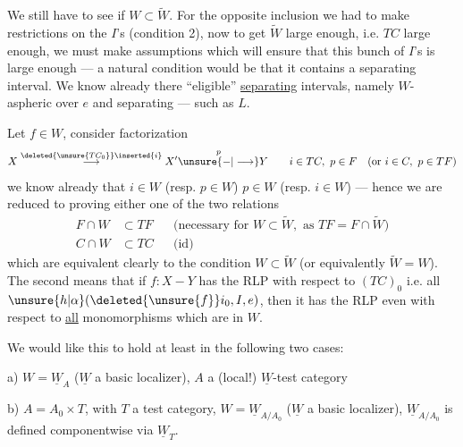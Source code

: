 
We still have to see if $W\subset\widetilde W$. For the opposite inclusion we had to make restrictions  on the $I$'s (condition 2), now to get $\widetilde W$ large enough, i.e. $TC$ large enough, we must make assumptions which will ensure that this bunch of $I$'s is large enough --- a natural condition would be that it contains a separating interval. We know already there   ``eligible'' \uline{separating} intervals, namely $W$-aspheric over $e$ and separating --- such as $L$.

Let $f\in W$, consider factorization
\[
X\overset{\deleted{\unsure{TC_0}}\inserted{i}}{\longrightarrow}X'\overset{p}{\unsure{-|\longrightarrow}}Y\qquad i\in TC,\ p\in F\quad(\text{or }i\in C,\ p\in TF)
\]
we know already that $i\in W$ (resp. $p\in W$)  $p\in W$ (resp. $i\in W$) --- hence we are reduced to  proving either one of the two relations
\[
\begin{aligned}
F\cap W&\subset TF&&\text{(necessary for }W\subset\widetilde W,\text{ as }TF=F\cap\widetilde W)\\
C\cap W&\subset TC&&\text{(id)}
\end{aligned}
\]
which are  equivalent  clearly to the condition $W\subset\widetilde W$ (or equivalently  $\widetilde W=W$). The second \inserted{[first!]} means that if $f:X-Y$ \inserted{[is in $W$ and]} has the  RLP with respect to $(TC)_0$ i.e. all  $\unsure{h|\alpha}(\deleted{\unsure{f}}i_0,I,e)$, then it has the RLP even with respect to \uline{all} monomorphisms which are in $W$.
\margin{[????]}

We would like this to hold at least in the following two cases:


a) $W=\underline W_A$ ($\underline W$ a basic localizer), $A$ a (local!) $\underline W$-test category

b) $A=A_0\times T$,  with $T$ a test category, $W=\underline W_{A/A_0}$ ($\underline W$ a basic localizer), $\underline W_{A/A_0}$ is defined componentwise via $\underline W_T$.

